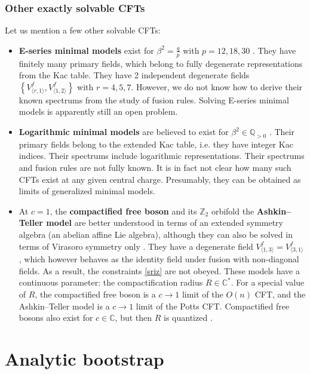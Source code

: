 \documentclass[12pt, a4paper]{article}
\newcommand{\myindex}[1]{\textbf{\boldmath #1}}
\begin{document}
\subsubsection{Other exactly solvable CFTs}

Let us mention a few other solvable CFTs:
\begin{itemize}
 \item \myindex{E-series minimal models} exist for $\beta^2=\frac{q}{p}$ with $p=12, 18, 30$ \cite{fms97}. They have finitely many primary fields, which belong to fully degenerate representations from the Kac table. 
They have 2 independent degenerate fields $\left\{V^f_{\langle r,1\rangle},V^f_{\langle 1,2\rangle}\right\}$ with $r=4,5,7$. 
However, we do not know how to derive their known spectrums from the study of fusion rules. 
Solving E-series minimal models is apparently still an open problem. 
\item \myindex{Logarithmic minimal models} are believed to exist for $\beta^2\in \mathbb{Q}_{>0}$ \cite{prz06}. Their primary fields belong to the extended Kac table, i.e. they have integer Kac indices. Their spectrums include logarithmic representations. Their spectrums and fusion rules are not fully known. It is in fact not clear how many such CFTs exist at any given central charge. Presumably, they can be obtained as limits of generalized minimal models. 
\item At $c=1$, the \myindex{compactified free boson} and its $\mathbb{Z}_2$ orbifold the \myindex{Ashkin--Teller model} are better understood in terms of an extended symmetry algebra (an abelian affine Lie algebra), although they can also be solved in terms of Virasoro symmetry only \cite{nr21}. They have a degenerate field $V^f_{\langle 1, 3\rangle}=V^f_{\langle 3,1\rangle}$, which however behaves as the identity field under fusion with non-diagonal fields. As a result, the constraints \eqref{sriz} are not obeyed. These models have a continuous parameter: the compactification radius $R\in\mathbb{C}^*$. For a special value of $R$, the compactified free boson is a $c\to 1$ limit of the $O(n)$ CFT, and the Ashkin--Teller model is a $c\to 1$ limit of the Potts CFT. Compactified free bosons also exist for $c\in\mathbb{C}$, but then $R$ is quantized \cite{rib14}. 
\end{itemize}


\section{Analytic bootstrap}\label{sec:ab}
\end{document}
